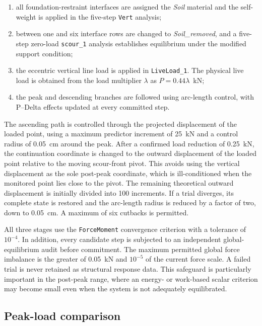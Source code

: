 \begin{enumerate}
    \item all foundation-restraint interfaces are assigned the \emph{Soil}
    material and the self-weight is applied in the five-step \texttt{Vert}
    analysis;
    \item between one and six interface rows are changed to
    \emph{Soil\_removed}, and a five-step zero-load \texttt{scour\_1}
    analysis establishes equilibrium under the modified support condition;
    \item the eccentric vertical line load is applied in
    \texttt{LiveLoad\_1}. The physical live load is obtained from the load
    multiplier $\lambda$ as $P=0.44\lambda$~kN;
    \item the peak and descending branches are followed using arc-length
    control, with P--Delta effects updated at every committed step.
\end{enumerate}

The ascending path is controlled through the projected displacement of the
loaded point, using a maximum predictor increment of 25~kN and a control
radius of 0.05~cm around the peak. After a confirmed load reduction of
0.25~kN, the continuation coordinate is changed to the outward displacement
of the loaded point relative to the moving scour-front pivot. This avoids
using the vertical displacement as the sole post-peak coordinate, which is
ill-conditioned when the monitored point lies close to the pivot. The
remaining theoretical outward displacement is initially divided into 100
increments. If a trial diverges, its complete state is restored and the
arc-length radius is reduced by a factor of two, down to 0.05~cm. A maximum of
six cutbacks is permitted.

All three stages use the \texttt{ForceMoment} convergence criterion with a
tolerance of $10^{-4}$. In addition, every candidate step is subjected to an
independent global-equilibrium audit before commitment. The maximum permitted
global force imbalance is the greater of 0.05~kN and $10^{-5}$ of the current
force scale. A failed trial is never retained as structural response data.
This safeguard is particularly important in the post-peak range, where an
energy- or work-based scalar criterion may become small even when the system
is not adequately equilibrated.

\subsection{Peak-load comparison}
\label{sec:wall-validation-results}

